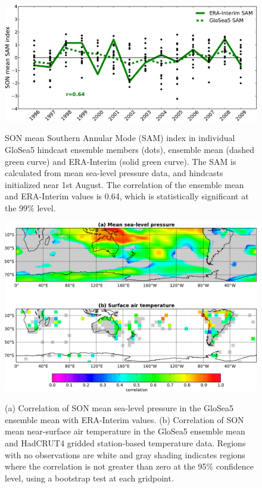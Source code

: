 \begin{figure}[t]
  \noindent\includegraphics[width=\textwidth,angle=0]{figures/GloSea5/sam_crop.pdf}\\
  \caption[GloSea5 predictions of the SAM.]{SON mean Southern Annular Mode (SAM) index in individual GloSea5 hindcast ensemble members (dots), ensemble mean (dashed green curve) and ERA-Interim (solid green curve). The SAM is calculated from mean sea-level pressure data, and hindcasts initialized near 1st August. The correlation of the ensemble mean and ERA-Interim values is 0.64, which is statistically significant at the 99\% level.}\label{Fig5}
\end{figure}

\begin{figure}[t]
  \noindent\includegraphics[width=\textwidth,angle=0]{figures/GloSea5/mslp_tsrf_maps_crop.pdf}\\
  \caption[Correlation of GloSea5 forecasts of sea-level pressure and temperature.]{(a) Correlation of SON mean sea-level pressure in the GloSea5 ensemble mean with ERA-Interim values. (b) Correlation of SON mean near-surface air temperature in the GloSea5 ensemble mean and HadCRUT4 gridded station-based temperature data. Regions with no observations are white and gray shading indicates regions where the correlation is not greater than zero at the 95\% confidence level, using a bootstrap test at each gridpoint.}\label{Fig6}
\end{figure}

